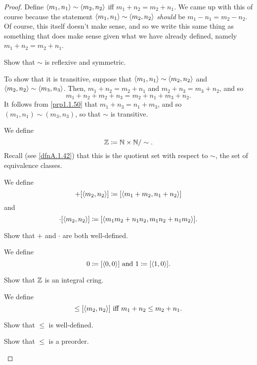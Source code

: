 \begin{thm}[Integers]
\begin{proof}
Define $\langle m_1,n_1\rangle\sim \langle m_2,n_2\rangle$ iff $m_1+n_2=m_2+n_1$.  We came up with this of course because the statement $\langle m_1,n_1\rangle\sim \langle m_2,n_2\rangle$ \emph{should} be $m_1-n_1=m_2-n_2$.  Of course, this itself doesn't make sense, and so we write this same thing as something that does make sense given what we have already defined, namely $m_1+n_2=m_2+n_1$.

\begin{exr}
Show that $\sim$ is reflexive and symmetric.
\end{exr}
To show that it is transitive, suppose that $\langle m_1,n_1\rangle\sim \langle m_2,n_2\rangle$ and $\langle m_2,n_2\rangle\sim \langle m_3,n_3\rangle$.  Then, $m_1+n_2=m_2+n_1$ and $m_2+n_3=m_3+n_2$, and so
\begin{equation}
m_1+n_2+m_2+n_3=m_2+n_1+m_3+n_2.
\end{equation}
It follows from \cref{prp1.1.50} that $m_1+n_3=n_1+m_3$, and so $(m_1,n_1)\sim (m_3,n_3)$, so that $\sim$ is transitive.

We define
\begin{equation}
\mathbb{Z} \coloneqq \mathbb{N} \times \mathbb{N} /\sim .
\end{equation}
Recall (see \cref{dfnA.1.42}) that this is the quotient set with respect to $\sim$, the set of equivalence classes.

We define
\begin{equation}
[\coord{m_1,n_1}]+[\coord{m_2,n_2}]\coloneqq [\coord{m_1+m_2,n_1+n_2}]
\end{equation}
and
\begin{equation}
[\coord{m_1,n_1}]\cdot [\coord{m_2,n_2}]\coloneqq [\coord{m_1m_2+n_1n_2,m_1n_2+n_1m_2}].
\end{equation}
\begin{exr}
Show that $+$ and $\cdot$ are both well-defined.
\end{exr}

We define
\begin{equation}
0\coloneqq [\langle0,0\rangle]\text{ and }1\coloneqq [\langle1,0\rangle].
\end{equation}

\begin{exr}
Show that $\mathbb{Z}$ is an integral cring.
\end{exr}

We define
\begin{equation}
[\coord{m_1,n_1}]\leq [\coord{m_2,n_2}]\text{ iff }m_1+n_2\leq m_2+n_1.
\end{equation}
\begin{exr}
Show that $\leq$ is well-defined.
\end{exr}
\begin{exr}
Show that $\leq$ is a preorder.
\end{exr}


\end{proof}
\end{thm}
